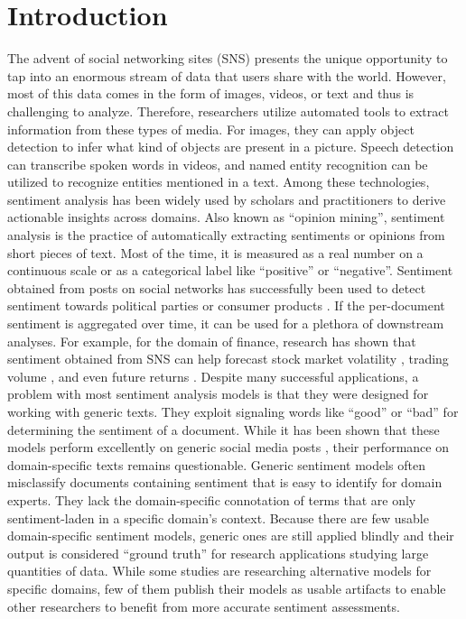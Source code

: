 \section{Introduction}

The advent of social networking sites (SNS) presents the unique opportunity to tap into an enormous stream of data that users share with the world. However, most of this data comes in the form of images, videos, or text and thus is challenging to analyze. Therefore, researchers utilize automated tools to extract information from these types of media. For images, they can apply object detection to infer what kind of objects are present in a picture. Speech detection can transcribe spoken words in videos, and named entity recognition can be utilized to recognize entities mentioned in a text. Among these technologies, sentiment analysis has been widely used by scholars and practitioners to derive actionable insights across domains. Also known as ``opinion mining'', sentiment analysis is the practice of automatically extracting sentiments or opinions from short pieces of text. Most of the time, it is measured as a real number on a continuous scale or as a categorical label like ``positive'' or ``negative''. Sentiment obtained from posts on social networks has successfully been used to detect sentiment towards political parties  or consumer products \cite{pontiki2016semeval}. If the per-document sentiment is aggregated over time, it can be used for a plethora of downstream analyses. For example, for the domain of finance, research has shown that sentiment obtained from SNS can help forecast stock market volatility , trading volume , and even future returns .\newline
Despite many successful applications, a problem with most sentiment analysis models is that they were designed for working with generic texts. They exploit signaling words like ``good'' or ``bad'' for determining the sentiment of a document. While it has been shown that these models perform excellently on generic social media posts \cite{al2020evaluating}, their performance on domain-specific texts remains questionable. Generic sentiment models often misclassify documents containing sentiment that is easy to identify for domain experts. They lack the domain-specific connotation of terms that are only sentiment-laden in a specific domain's context. Because there are few usable domain-specific sentiment models, generic ones are still applied blindly and their output is considered ``ground truth'' for research applications studying large quantities of data. While some studies are researching alternative models for specific domains, few of them publish their models as usable artifacts to enable other researchers to benefit from more accurate sentiment assessments.

